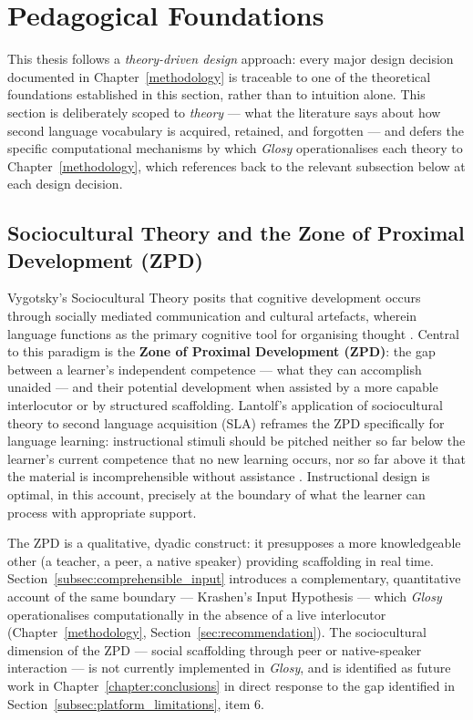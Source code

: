 \section{Pedagogical Foundations}
\label{sec:pedagogical_foundations}

    This thesis follows a \emph{theory-driven design} approach: every major design decision documented in Chapter~\ref{methodology} is traceable to one of the theoretical foundations established in this section, rather than to intuition alone. This section is deliberately scoped to \emph{theory} --- what the literature says about how second language vocabulary is acquired, retained, and forgotten --- and defers the specific computational mechanisms by which \textit{Glosy} operationalises each theory to Chapter~\ref{methodology}, which references back to the relevant subsection below at each design decision.

    \subsection{Sociocultural Theory and the Zone of Proximal Development (ZPD)}
    \label{subsec:sociocultural_theory}
    Vygotsky's Sociocultural Theory posits that cognitive development occurs through socially mediated communication and cultural artefacts, wherein language functions as the primary cognitive tool for organising thought \cite{vygotsky1978mind}. Central to this paradigm is the \textbf{Zone of Proximal Development (ZPD)}: the gap between a learner's independent competence --- what they can accomplish unaided --- and their potential development when assisted by a more capable interlocutor or by structured scaffolding. Lantolf's application of sociocultural theory to second language acquisition (SLA) reframes the ZPD specifically for language learning: instructional stimuli should be pitched neither so far below the learner's current competence that no new learning occurs, nor so far above it that the material is incomprehensible without assistance \cite{lantolf2000sociocultural}. Instructional design is optimal, in this account, precisely at the boundary of what the learner can process with appropriate support.

    The ZPD is a qualitative, dyadic construct: it presupposes a more knowledgeable other (a teacher, a peer, a native speaker) providing scaffolding in real time. Section~\ref{subsec:comprehensible_input} introduces a complementary, quantitative account of the same boundary --- Krashen's Input Hypothesis --- which \textit{Glosy} operationalises computationally in the absence of a live interlocutor (Chapter~\ref{methodology}, Section~\ref{sec:recommendation}). The sociocultural dimension of the ZPD --- social scaffolding through peer or native-speaker interaction --- is not currently implemented in \textit{Glosy}, and is identified as future work in Chapter~\ref{chapter:conclusions} in direct response to the gap identified in Section~\ref{subsec:platform_limitations}, item 6.

